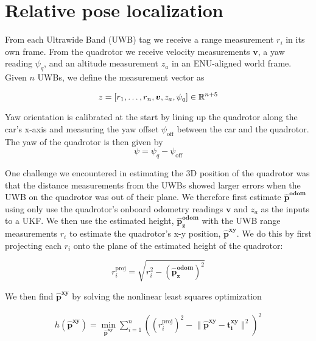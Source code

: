 
\section{Relative pose localization}

From each Ultrawide Band (UWB) tag we receive a range measurement $r_i$ in its own frame. 
From the quadrotor we receive velocity measurements $\bm{v}$, a yaw reading $\psi_q$,
and an altitude measurement $z_a$ in an ENU-aligned world frame.
Given $n$ UWBs, we define the measurement vector as

$$
   z = [r_1, \dots, r_n, \bm{v}, z_a, \psi_q] \in \mathbb{R}^{n+5}
$$



Yaw orientation is calibrated at the start by lining up the quadrotor along the car's x-axis
and measuring the yaw offset $\psi_{\text{off}}$ between the car and the quadrotor.
The yaw of the quadrotor is then given by
$$
   \psi = \psi_q - \psi_{\text{off}}
$$

One challenge we encountered in estimating the 3D position of the quadrotor was that
the distance measurements from the UWBs showed larger errors when the UWB on the quadrotor was out of their plane.
We therefore first estimate $\bm{\hat{p}^{\text{odom}}}$ using only use the quadrotor's onboard 
odometry readings $\bm{v}$ and $z_a$ as the inputs to a UKF. We then use the estimated
height, $\bm{\hat{p}_z^{\text{odom}}}$ with the UWB range
measurements $r_i$ to estimate the quadrotor's x-y position, $\bm{\hat{p}^{xy}}$.
We do this by first projecting each $r_i$ onto the plane of the estimated height of the quadrotor:

$$
   r_i^{\text{proj}} = \sqrt{r_i^2 - (\bm{\hat{p}_z^{\text{odom}}})^2}
$$

We then find $\bm{\hat{p}^{xy}}$ by solving the nonlinear least squares optimization

\begin{align*} 
    h(\bm{\hat{p}^{xy}}) = \min_{{\bm{\hat{p}^{xy}}}} \sum_{i=1}^{n} ((r_{i}^{\text{proj}})^2 - \lVert \bm{\hat{p}^{xy}} - \bm{t_i^{xy}}\rVert^2)^2
\end{align*}


